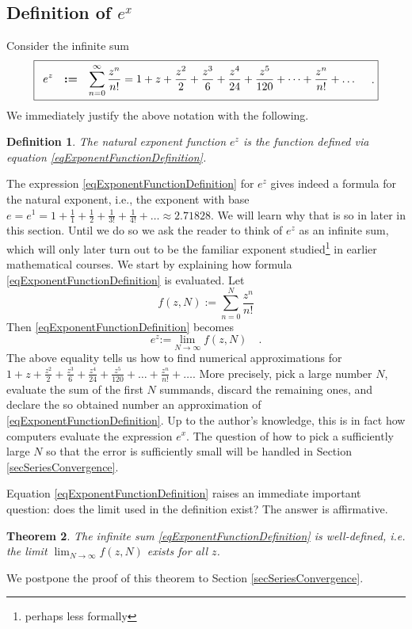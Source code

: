 \documentclass[12pt]{book}
\newcommand{\eqdef}{\textbf{:=}}
\newcommand{\importantFormula}[1]{\begin{equation} \boxed{#1} \end{equation}}
\newtheorem{theorem}{Theorem}[section]
\newtheorem{definition}[theorem]{Definition}
\begin{document}
\subsection{Definition of $e^x$}
Consider the infinite sum
\importantFormula{\label{eqExponentFunctionDefinition}
\begin{array}{rcl}
\displaystyle e^{z}&\eqdef &\displaystyle \sum_{n=0}^{\infty} \frac{z^n}{n!} = 1+z+\frac{z^{2}}{2}+\frac{z^3}{6}+\frac{z^4}{24}+\frac{z^5}{120}+\dots+\frac{z^n}{n!}+\dots\\
\end{array} \quad .
}
We immediately justify the above notation with the following.
\begin{definition}\label{defNaturalExponent}
 The natural exponent function $e^z$ is the function defined via equation \eqref{eqExponentFunctionDefinition}.
\end{definition}
The expression \eqref{eqExponentFunctionDefinition} for $e^z$ gives indeed a formula for the natural exponent, i.e., the exponent with base $e= e^1= 1+ \frac{1}{1} +\frac{1}2 +\frac{1}{3!} +\frac{1}{4!}+\dots \approx 2.71828$. We will learn why that is so in later in this section. Until we do so we ask the reader to think of $e^{z}$ as an infinite sum, which will only later turn out to be the familiar exponent studied\footnote{perhaps less formally} in earlier mathematical courses. We start by explaining how formula \eqref{eqExponentFunctionDefinition} is evaluated. Let 
\[
\displaystyle f(z,N):=\sum\limits_{n=0}^{N} \frac{z^n}{n!}
\]
Then \eqref{eqExponentFunctionDefinition} becomes 
\[
e^z\eqdef \displaystyle\lim\limits_{N\to \infty} f(z, N)\quad .
\]
The above equality tells us how to find numerical approximations for $1+z+\frac{z^{2}}{2}+\frac{z^3}{6}+\frac{z^4}{24}+\frac{z^5}{120}+\dots+\frac{z^n}{n!}+\dots$. More precisely, pick a large number $N$, evaluate the sum of the first $N$ summands, discard the remaining ones, and declare the so obtained number an approximation of \eqref{eqExponentFunctionDefinition}. Up to the author's knowledge, this is in fact how computers evaluate the expression $e^x$. The question of how to pick a sufficiently large $N$ so that the error is sufficiently small will be handled in Section \ref{secSeriesConvergence}. 

Equation \eqref{eqExponentFunctionDefinition} raises an immediate important question: does the limit used in the definition exist? The answer is affirmative.
\begin{theorem} The infinite sum \eqref{eqExponentFunctionDefinition} is well-defined, i.e. the limit $\displaystyle\lim_{N\to \infty} f(z, N)$ exists for all $z$.
\end{theorem}
We postpone the proof of this theorem to Section \ref{secSeriesConvergence}. 
\end{document}
